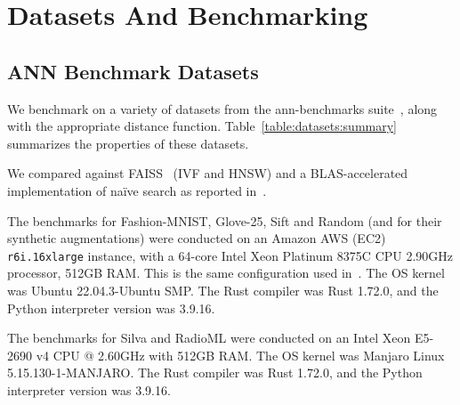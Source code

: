 
\section{Datasets And Benchmarking}
\label{sec:datasets-and-benchmarks}

\subsection{ANN Benchmark Datasets}
\label{subsec:ann-benchmarks}


We benchmark on a variety of datasets from the ann-benchmarks suite~\cite{Aumller2018ANNBenchmarksAB}, along with the appropriate distance function.
Table~\ref{table:datasets:summary} summarizes the properties of these datasets.

We compared against FAISS~\cite{johnson2019billion} (IVF and HNSW) and a BLAS-accelerated implementation of na\"ive search as reported in~\cite{johnson2019billion}.

The benchmarks for Fashion-MNIST, Glove-25, Sift and Random (and for their synthetic augmentations) were conducted on an Amazon AWS (EC2) \texttt{r6i.16xlarge} instance, with a 64-core Intel Xeon Platinum 8375C CPU 2.90GHz processor, 512GB RAM.
This is the same configuration used in~\cite{Aumller2018ANNBenchmarksAB}.
The OS kernel was Ubuntu 22.04.3-Ubuntu SMP.
The Rust compiler was Rust 1.72.0, and the Python interpreter version was 3.9.16.

The benchmarks for Silva and RadioML were conducted on an Intel Xeon E5-2690 v4 CPU @ 2.60GHz with 512GB RAM.
The OS kernel was Manjaro Linux 5.15.130-1-MANJARO.
The Rust compiler was Rust 1.72.0, and the Python interpreter version was 3.9.16.


